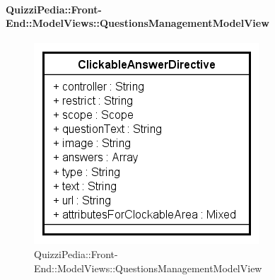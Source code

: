 \paragraph{QuizziPedia::Front-End::ModelViews::QuestionsManagementModelView}

\label{QuizziPedia::Front-End::ModelViews::QuestionsManagementModelView}

\begin{figure}[ht]
	\centering
	\includegraphics[scale=0.5,keepaspectratio]{UML/Classi/Front-End/QuizziPedia_Front-end_Templates_ClickableAnswerTemplate.png}
	\caption{QuizziPedia::Front-End::ModelViews::QuestionsManagementModelView}
\end{figure} \FloatBarrier

